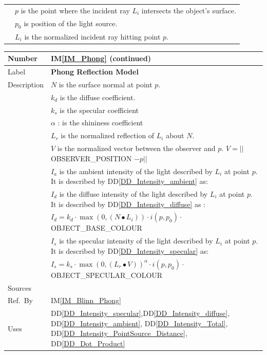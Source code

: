 \documentclass[12pt]{article}
\newcommand{\colAwidth}{0.13\textwidth}
\newcommand{\colBwidth}{0.82\textwidth}
\newcommand{\ddref}[1]{DD\ref{#1}}
\newcommand{\iref}[1]{IM\ref{#1}}
\begin{document}
\begin{minipage}{\textwidth}
\begin{tabular}{| p{\colAwidth} | p{\colBwidth}|}
		& $p$ is the point where the incident ray $L_{i}$ intersects the 
		object's surface.\\
		& $p_{0}$ is position of the light source. \\				
		& $L_{i}$ is the normalized incident ray hitting point $p$.\\
		\hline
	\end{tabular}
\end{minipage}

\begin{minipage}{\textwidth}
	\renewcommand*{\arraystretch}{1.5}
	\begin{tabular}{| p{\colAwidth} | p{\colBwidth}|}
		\hline
		\rowcolor[gray]{0.9}
		Number& \iref{IM_Phong} (continued)\\
		\hline
		Label& \bf Phong Reflection Model\\
		\hline
		Description & $N$ is the surface normal at point 
		$p$.\\
		& $k_{d}$ is the diffuse coefficient.\\
		& $k_{s}$ is the specular coefficient\\
		& $\alpha$ : is the shininess coefficient\\		
		& $L_{r}$ is the normalized reflection of $L_{i}$ about $N$.\\
		& $V$ is the normalized vector between the observer and $p$. $V = 
		||$OBSERVER\_POSITION $- p||$\\
		& $I_{a}$ is the ambient intensity of the light described by 
		$L_{i}$ at point $p$. It is described by 
		\ddref{DD_Intensity_ambient} as:\\
		& $I_{d}$ is the diffuse intensity of the light described by 
		$L_{i}$ at point $p$. It is described by 
		\ddref{DD_Intensity_diffuse} as : \\
		& $I_{d} = k_{d} \cdot \max(0, (N \bullet 
		L_{i}))\cdot i(p,p_{0}) \cdot$ OBJECT\_BASE\_COLOUR \\
		& $I_{s}$ is the specular intensity of the light described by 
		$L_{i}$ at point $p$. It is described by 
		\ddref{DD_Intensity_specular} as: \\
		& $I_{s} = k_{s} \cdot \max(0, (L_{r} \bullet V))^\alpha \cdot
		i(p,p_{0})\cdot$ OBJECT\_SPECULAR\_COLOUR \\
		\hline
		Sources& \cite{Comninos2005,Lengyel2003,shreiner2012} \\
		\hline
		Ref.\ By & \iref{IM_Blinn_Phong}\\
		\hline
		Uses & \ddref{DD_Intensity_specular},\ddref{DD_Intensity_diffuse}, 
		\ddref{DD_Intensity_ambient}, \ddref{DD_Intensity_Total}, 
		\ddref{DD_Intensity_PointSource_Distance}, \ddref{DD_Dot_Product} \\
		\hline
	\end{tabular}
\end{minipage}\\
\end{document}

